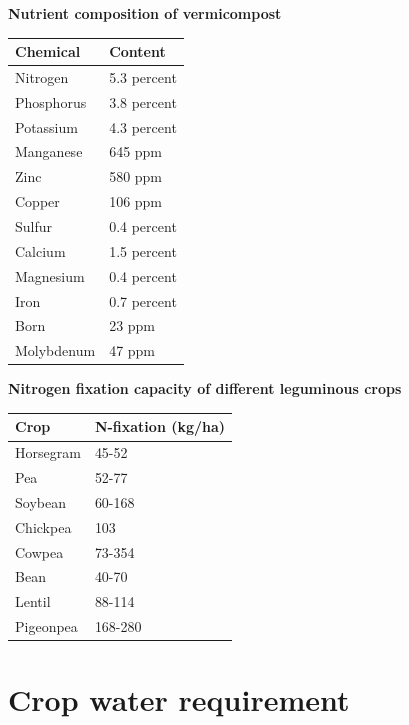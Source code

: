 \documentclass[
  openany]{book}
\begin{document}
\textbf{Nutrient composition of vermicompost}

\begin{table}[H]
\centering
\begin{tabular}{ll}
\toprule
Chemical & Content\\
\midrule
Nitrogen & 5.3 percent\\
Phosphorus & 3.8 percent\\
Potassium & 4.3 percent\\
Manganese & 645 ppm\\
Zinc & 580 ppm\\
\addlinespace
Copper & 106 ppm\\
Sulfur & 0.4 percent\\
Calcium & 1.5 percent\\
Magnesium & 0.4 percent\\
Iron & 0.7 percent\\
\addlinespace
Born & 23 ppm\\
Molybdenum & 47 ppm\\
\bottomrule
\end{tabular}
\end{table}

\textbf{Nitrogen fixation capacity of different leguminous crops}

\begin{table}[H]
\centering
\begin{tabular}{ll}
\toprule
Crop & N-fixation (kg/ha)\\
\midrule
Horsegram & 45-52\\
Pea & 52-77\\
Soybean & 60-168\\
Chickpea & 103\\
Cowpea & 73-354\\
\addlinespace
Bean & 40-70\\
Lentil & 88-114\\
Pigeonpea & 168-280\\
\bottomrule
\end{tabular}
\end{table}

\hypertarget{crop-water-requirement}{%
\section{Crop water requirement}\label{crop-water-requirement}}

\begingroup\fontsize{8}{10}\selectfont
\end{document}
